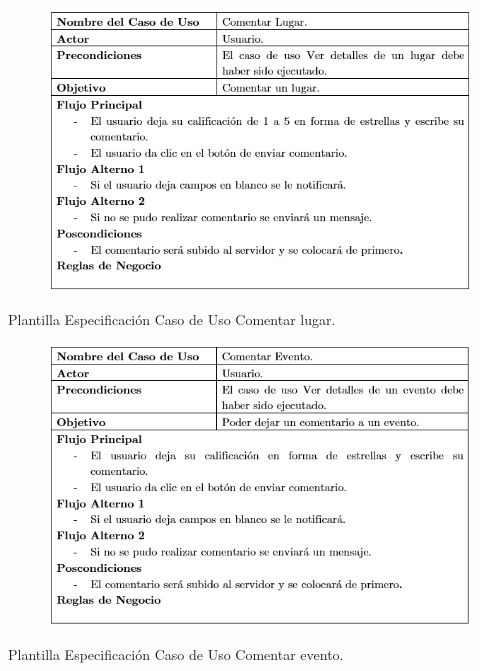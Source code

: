 \documentclass[12pt,letterpaper,openany]{book}
\begin{document}
\begin{table}[H]
\begin{center}
\begin{figure}[H]
\begin{center}
\includegraphics[width=13cm]{./imagenes/PCU/comentar_lugar}
\end{center}
\end{figure}
\end{center}
\caption{Plantilla Especificación Caso de Uso Comentar lugar.}
\end{table}

\begin{table}[H]
\begin{center}
\begin{figure}[H]
\begin{center}
\includegraphics[width=13cm]{./imagenes/PCU/comentar_evento}
\end{center}
\end{figure}
\end{center}
\caption{Plantilla Especificación Caso de Uso Comentar evento.}
\end{table}
\end{document}
